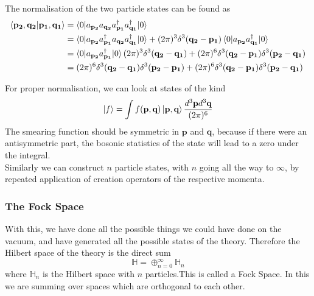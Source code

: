 \documentclass[11pt, notitlepage]{report}
\renewcommand{\a}[1]{a_\mathbf{#1}}
\newcommand{\adag}[1]{a^\dagger_\mathbf{#1}}
\numberwithin{equation}{section}
\begin{document}
    The normalisation of the two particle states can be found as 
    \begin{align*}
        \braket{\mathbf{p_2}, \mathbf{q_2} | \mathbf{p_1}, \mathbf{q_1}} &= \braket{0|\a{p_2}\a{q_2} \adag{p_1}\adag{q_1}|0}\\
        &= \braket{0|\a{p_2} \adag{p_1} \a{q_2} \adag{q_1}|0} + (2\pi)^3\delta^3(\mathbf{q_2} - \mathbf{p_1})\braket{0|\a{p_2}\adag{q_1}|0} \\
        &= \braket{0|\a{p_2} \adag{p_1}|0} (2\pi)^3\delta^3(\mathbf{q_2} - \mathbf{q_1})+ (2\pi)^6\delta^3(\mathbf{q_2} - \mathbf{p_1})\delta^3(\mathbf{p_2} - \mathbf{q_1}) \\
        &= (2\pi)^6\delta^3(\mathbf{q_2} - \mathbf{q_1})\delta^3(\mathbf{p_2} - \mathbf{p_1})+ (2\pi)^6\delta^3(\mathbf{q_2} - \mathbf{p_1})\delta^3(\mathbf{p_2} - \mathbf{q_1}) 
    \end{align*}

    For proper normalisation, we can look at states of the kind 
    \begin{equation*}
        \ket{f} = \int f(\textbf{p}, \textbf{q}) \ket{\textbf{p}, \textbf{q}} \frac{d^3\textbf{p}d^3\textbf{q}}{(2\pi)^6} 
    \end{equation*}
    The smearing function should be symmetric in \(\textbf{p}\) and \(\textbf{q}\), because if there were an antisymmetric part, the bosonic statistics of the state will lead to a zero under the integral.\\
    
    Similarly we can construct \(n\) particle states, with \(n\) going all the way to \(\infty\), by repeated application of creation operators of the respective momenta.\\

    \subsubsection{The Fock Space}    
    With this, we have done all the possible things we could have done on the vacuum, and have generated all the possible states of the theory. Therefore the Hilbert space of the theory is the direct sum 
    \begin{equation}
        \mathbb{H} = \oplus_{n=0}^{\infty}\mathbb{H}_n
    \end{equation}
    where \(\mathbb{H}_n\) is the Hilbert space with \(n\) particles.This is called a Fock Space. In this we are summing over spaces which are orthogonal to each other. \\
    
\end{document}
